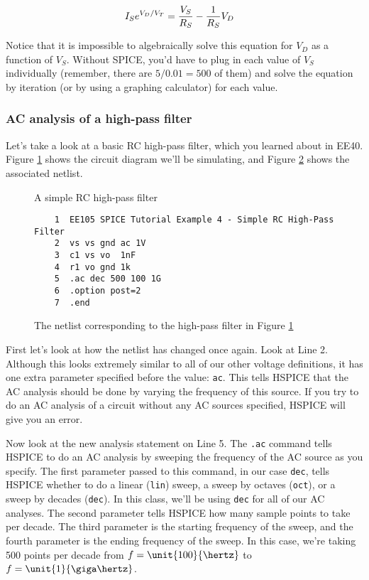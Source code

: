 \documentclass{article}
\begin{document}
\begin{align*}
  I_S e^{V_D/V_T} &= \frac{V_S}{R_S} - \frac{1}{R_S}V_D
\end{align*}

Notice that it is impossible to algebraically solve this equation for $V_D$ as a function of $V_S$. Without SPICE, you'd have to plug in each value of $V_S$ individually (remember, there are $5/0.01 = 500$ of them) and solve the equation by iteration (or by using a graphing calculator) for each value.

\subsubsection{AC analysis of a high-pass filter}

Let's take a look at a basic RC high-pass filter, which you learned about in EE40. Figure \ref{acdiagram} shows the circuit diagram we'll be simulating, and Figure \ref{acnetlist} shows the associated netlist.

\begin{figure}[!htb]
  
  \centerline{\box\graph}
  \caption{A simple RC high-pass filter}
  \label{acdiagram}
\end{figure}

\begin{figure}[!htb]
  \begin{verbatim}
    1  EE105 SPICE Tutorial Example 4 - Simple RC High-Pass Filter
    2  vs vs gnd ac 1V
    3  c1 vs vo  1nF
    4  r1 vo gnd 1k
    5  .ac dec 500 100 1G
    6  .option post=2
    7  .end \end{verbatim}
  \caption{The netlist corresponding to the high-pass filter in Figure \ref{acdiagram}}
  \label{acnetlist}
\end{figure}

First let's look at how the netlist has changed once again. Look at Line 2. Although this looks extremely similar to all of our other voltage definitions, it has one extra parameter specified before the value: \verb|ac|. This tells HSPICE that the AC analysis should be done by varying the frequency of this source. If you try to do an AC analysis of a circuit without any AC sources specified, HSPICE will give you an error.

Now look at the new analysis statement on Line 5. The \verb|.ac| command tells HSPICE to do an AC analysis by sweeping the frequency of the AC source as you specify. The first parameter passed to this command, in our case \verb|dec|, tells HSPICE whether to do a linear (\verb|lin|) sweep, a sweep by octaves (\verb|oct|), or a sweep by decades (\verb|dec|). In this class, we'll be using \verb|dec| for all of our AC analyses. The second parameter tells HSPICE how many sample points to take per decade. The third parameter is the starting frequency of the sweep, and the fourth parameter is the ending frequency of the sweep. In this case, we're taking 500 points per decade from $f=\unit{100}{\hertz}$ to $f=\unit{1}{\giga\hertz}$.
\end{document}
